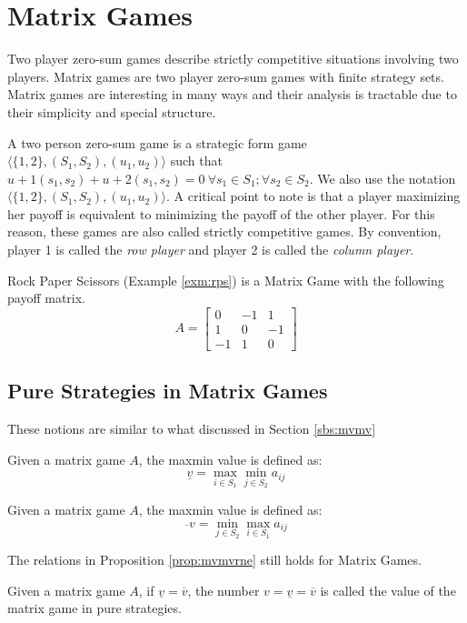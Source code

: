 \section{Matrix Games}
Two player zero-sum games describe strictly competitive situations involving two players.
Matrix games are two player zero-sum games with finite strategy sets.
Matrix games are interesting in many ways and their analysis is tractable due to their simplicity and special structure.

A two person zero-sum game is a strategic form game $\langle \{1, 2\}, (S_1, S_2), (u_1, u_2)\rangle$ such that $u+1(s_1, s_2) + u+2(s_1, s_2) = 0 \ \forall s_1 \in S_1; \forall s_2 \in S_2$.
We also use the notation $\langle \{1, 2\}, (S_1, S_2), (u_1, u_2)\rangle$.
A critical point to note is that a player maximizing her payoff is equivalent to minimizing the payoff of the other player.
For this reason, these games are also called strictly competitive games.
By convention, player 1 is called the \emph{row player} and player 2 is called the \emph{column player}.

Rock Paper Scissors (Example \ref{exm:rps}) is a Matrix Game with the following payoff matrix.
\[A=
\begin{bmatrix}
	0& -1& 1\\
	1& 0& -1\\
	-1& 1& 0
\end{bmatrix}\]
\subsection{Pure Strategies in Matrix Games}
These notions are similar to what discussed in Section \ref{sbs:mvmv}
\begin{defn}
	Given a matrix game $A$, the maxmin value is defined as:
	\[\underline{v}=\max_{i\in S_1}\min_{j\in S_2}a_{ij}\]
\end{defn}
\begin{defn}
	Given a matrix game $A$, the maxmin value is defined as:
	\[\overline{}{v}=\min_{j\in S_2}\max_{i\in S_1}a_{ij}\]
\end{defn}
The relations in Proposition \ref{prop:mvmvrne} still holds for Matrix Games.
\begin{defn}
	Given a matrix game $A$, if $\underline{v} = \overline{v}$, the number $v=\underline{v} = \overline{v}$ is called the value of the matrix game in pure strategies.
\end{defn}
